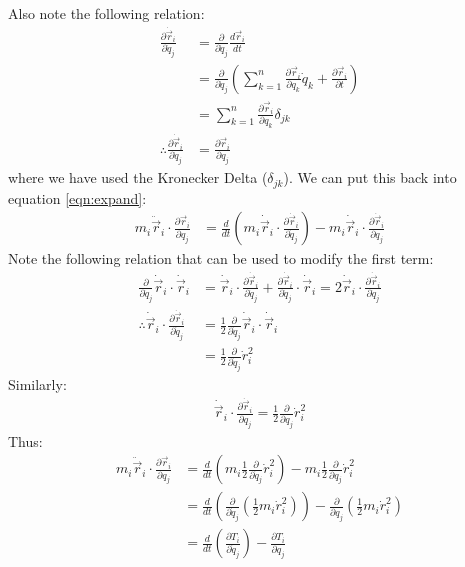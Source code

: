  Also note the following relation:
\begin{align}
\frac{\partial\dot{\vec{r}}_i}{\partial \dot{q}_j}&=\frac{\partial}{\partial \dot{q}_j}\frac{d\vec{r}_i}{dt}\nonumber\\
&=\frac{\partial}{\partial \dot{q}_j}\left(\sum_{k=1}^n\frac{\partial\vec{r}_i}{\partial q_k}\dot{q}_k+\frac{\partial\vec{r}_i}{\partial t}\right )\nonumber\\
&=\sum_{k=1}^n\frac{\partial\vec{r}_i}{\partial q_k}\delta_{jk} \nonumber\\
\therefore \frac{\partial\dot{\vec{r}}_i}{\partial \dot{q}_j}&=\frac{\partial\vec{r}_i}{\partial q_j}\nonumber
\end{align}
where we have used the Kronecker Delta ($\delta_{jk}$). We can put this back into equation \ref{eqn:expand}:
\begin{align}
m_i\ddot{\vec{r}}_i\cdot\frac{\partial\vec{r}_i}{\partial q_j} &= \frac{d}{dt}\left(m_i\dot{\vec{r}}_i\cdot\frac{\partial\dot{\vec{r}}_i}{\partial \dot{q}_j} \right) - m_i\dot{\vec{r}}_i\cdot\frac{\partial\dot{\vec{r}}_i}{\partial q_j}\nonumber
\end{align}
Note the following relation that can be used to modify the first term:
\begin{align}
\frac{\partial}{\partial \dot{q}_j}\dot{\vec{r}}_i\cdot\dot{\vec{r}}_i&=\dot{\vec{r}}_i\cdot\frac{\partial\dot{\vec{r}}_i}{\partial \dot{q}_j}+\frac{\partial\dot{\vec{r}}_i}{\partial \dot{q}_j}\cdot\dot{\vec{r}}_i=2\dot{\vec{r}}_i\cdot\frac{\partial\dot{\vec{r}}_i}{\partial \dot{q}_j}\nonumber\\
\therefore \dot{\vec{r}}_i\cdot\frac{\partial\dot{\vec{r}}_i}{\partial \dot{q}_j}&=\frac{1}{2}\frac{\partial}{\partial \dot{q}_j}\dot{\vec{r}}_i\cdot\dot{\vec{r}}_i\nonumber\\
&=\frac{1}{2}\frac{\partial}{\partial \dot{q}_j}\dot{r}_i^2
\end{align}
Similarly:
\begin{align}
\dot{\vec{r}}_i\cdot\frac{\partial\dot{\vec{r}}_i}{\partial q_j}
=\frac{1}{2}\frac{\partial}{\partial q_j}\dot{r}_i^2
\end{align}
Thus:
\begin{align}
m_i\ddot{\vec{r}}_i\cdot\frac{\partial\vec{r}_i}{\partial q_j} &= \frac{d}{dt}\left(m_i\frac{1}{2}\frac{\partial}{\partial \dot{q}_j}\dot{r}_i^2\right) - m_i\frac{1}{2}\frac{\partial}{\partial q_j}\dot{r}_i^2\nonumber\\
&=\frac{d}{dt}\left(\frac{\partial}{\partial \dot{q}_j}(\frac{1}{2}m_i\dot{r}_i^2)\right) - \frac{\partial}{\partial q_j}(\frac{1}{2}m_i\dot{r}_i^2)\nonumber\\
&=\frac{d}{dt}\left(\frac{\partial T_i}{\partial \dot{q}_j} \right) - \frac{\partial T_i}{\partial q_j}\nonumber
\end{align}
